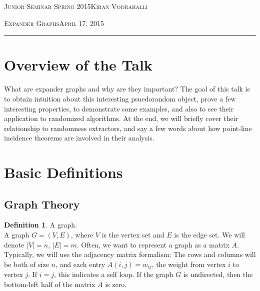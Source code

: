 \documentclass[11pt]{article}
\theoremstyle{definition}
\newtheorem{definition}[theorem]{Definition}
\theoremstyle{definition}
\theoremstyle{definition}
\def \lecturedate {April 17, 2015}
\begin{document}
\noindent
\begin{minipage}[t]{1\columnwidth}%
\textsc{Junior Seminar Spring 2015}\hspace*{\fill}\textsc{Kiran Vodrahalli}
\vspace{2mm}

\textsc{\LARGE Expander Graphs}\hspace*{\fill}\textsc{\lecturedate}

\noindent \rule[0.5ex]{1\linewidth}{1pt}

\vspace{10mm}
\end{minipage}






\tableofcontents

\section{Overview of the Talk}

What are expander graphs and why are they important? The goal of this talk is to obtain intuition about this interesting psuedorandom object, prove a few interesting properties, to demonstrate some examples, and also to see their application to randomized algorithms. At the end, we will briefly cover their relationship to randomness extractors, and say a few words about how point-line incidence theorems are involved in their analysis. 

\section{Basic Definitions}

\subsection{Graph Theory}

\begin{definition} A graph.  \\
A graph $G = (V, E)$, where $V$ is the vertex set
and $E$ is the edge set. We will denote $|V| = n$, $|E| = m$. 
Often, we want to represent a graph as a matrix $A$. Typically, we will use
the adjacency matrix formalism: The rows and columns will be both of size $n$, and
each entry $A(i, j) = w_{ij}$, the weight from vertex $i$ to vertex $j$. If $i = j$, 
this indicates a self loop. If the graph $G$ is undirected, then the bottom-left
half of the matrix $A$ is zero. 
\end{definition}
\end{document}
